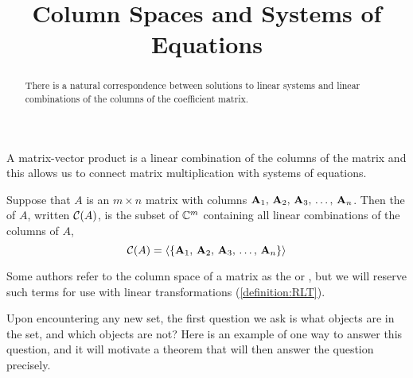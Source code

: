 \documentclass{ximera}
\title{Column Spaces and Systems of Equations}
\begin{document}
\begin{abstract}
  There is a natural correspondence between solutions to linear systems and linear combinations of the columns of the coefficient matrix.
\end{abstract}
\maketitle

A matrix-vector product is a linear combination of the columns of the matrix and this allows us to connect matrix multiplication with systems of equations.


\begin{definition}
  Suppose that $A$ is an $m\times n$ matrix with columns
  $\mathbf{A}_{1},\,\mathbf{A}_{2},\,\mathbf{A}_{3},\,\ldots,\,\mathbf{A}_{n}$.  Then the  of $A$, written
  $\mathcal{C}\!\left(A\right)$, is the subset of $\mathbb{C}^{m}$ containing all linear
  combinations of the columns of $A$,
  \[
    \mathcal{C}\!\left(A\right)=\left\langle\left\{\mathbf{A}_{1},\,\mathbf{A}_{2},\,\mathbf{A}_{3},\,\ldots,\,\mathbf{A}_{n}\right\}\right\rangle
  \]
\end{definition}

Some authors refer to the column space of a matrix as the 
or , but we will reserve such terms for use with linear
transformations (\ref{definition:RLT}).

Upon encountering any new set, the first question we ask is what
objects are in the set, and which objects are not?  Here is an example
of one way to answer this question, and it will motivate a theorem
that will then answer the question precisely.
\end{document}
